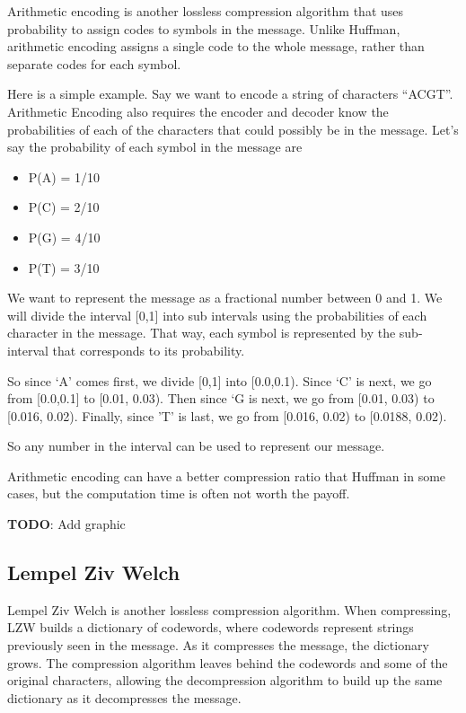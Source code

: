 \documentclass[12pt,twoside]{reedthesis}
\providecommand{\tightlist}{%
  \setlength{\itemsep}{0pt}\setlength{\parskip}{0pt}}
\begin{document}
Arithmetic encoding is another lossless compression algorithm that uses probability to assign codes to symbols in the message. Unlike Huffman, arithmetic encoding assigns a single code to the whole message, rather than separate codes for each symbol.

Here is a simple example. Say we want to encode a string of characters ``ACGT''. Arithmetic Encoding also requires the encoder and decoder know the probabilities of each of the characters that could possibly be in the message. Let's say the probability of each symbol in the message are
\begin{itemize}
\tightlist
\item
  P(A) = 1/10
\item
  P(C) = 2/10
\item
  P(G) = 4/10
\item
  P(T) = 3/10
\end{itemize}
We want to represent the message as a fractional number between 0 and 1. We will divide the interval {[}0,1{]} into sub intervals using the probabilities of each character in the message. That way, each symbol is represented by the sub-interval that corresponds to its probability.

So since `A' comes first, we divide {[}0,1{]} into {[}0.0,0.1). Since `C' is next, we go from {[}0.0,0.1{]} to {[}0.01, 0.03). Then since `G is next, we go from {[}0.01, 0.03) to {[}0.016, 0.02). Finally, since 'T' is last, we go from {[}0.016, 0.02) to {[}0.0188, 0.02).

So any number in the interval can be used to represent our message.

Arithmetic encoding can have a better compression ratio that Huffman in some cases, but the computation time is often not worth the payoff.

\textbf{TODO}: Add graphic

\hypertarget{lempel-ziv-welch}{%
\subsection{Lempel Ziv Welch}\label{lempel-ziv-welch}}

Lempel Ziv Welch is another lossless compression algorithm. When compressing, LZW builds a dictionary of codewords, where codewords represent strings previously seen in the message. As it compresses the message, the dictionary grows. The compression algorithm leaves behind the codewords and some of the original characters, allowing the decompression algorithm to build up the same dictionary as it decompresses the message.
\end{document}
